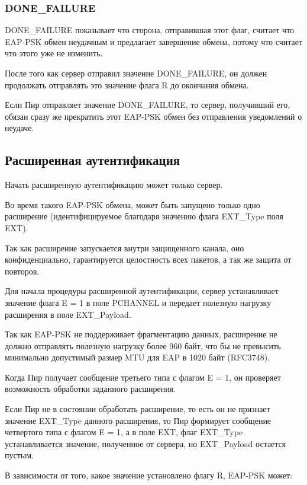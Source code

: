 \subsubsection{DONE\_FAILURE}

DONE\_FAILURE показывает что сторона, отправившая этот флаг, считает что EAP-PSK обмен неудачным и предлагает завершение обмена, потому что считает что этого уже не изменить.

После того как сервер отправил значение DONE\_FAILURE, он должен продолжать отправлять это значение флага R до окончания обмена.

Если Пир отправляет значение DONE\_FAILURE, то сервер, получивший его, обязан сразу же прекратить этот EAP-PSK обмен без отправления уведомлений о неудаче.

\subsection{Расширенная аутентификация}

Начать расширенную аутентификацию может только сервер.

Во время такого EAP-PSK обмена, может быть запущено только одно расширение (идентифицируемое благодаря значению флага EXT\_Type поля EXT).

Так как расширение запускается внутри защищенного канала, оно конфиденциально, гарантируется целостность всех пакетов, а так же защита от повторов.

Для начала процедуры расширенной аутентификации, сервер устанавливает значение флага E = 1 в поле PCHANNEL и передает полезную нагрузку расширения в поле EXT\_Payload.

Так как EAP-PSK не поддерживает фрагментацию данных, расширение не должно отправлять полезную нагрузку более 960 байт, что бы не превысить минимально допустимый размер MTU для EAP в 1020 байт (RFC3748).

Когда Пир получает сообщение третьего типа с флагом E = 1, он проверяет возможность обработки заданного расширения.

Если Пир не в состоянии обработать расширение, то есть он не признает значение EXT\_Type данного расширения, то Пир формирует сообщение четвертого типа с флагом E = 1, а в поле EXT, флаг EXT\_Type устанавливается значение, полученное от сервера, но EXT\_Payload остается пустым.

В зависимости от того, какое значение установлено флагу R, EAP-PSK может:

